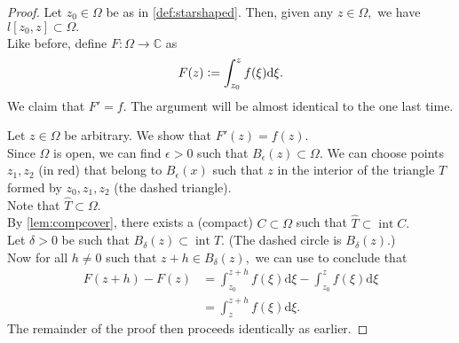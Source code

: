 \starprimitive*\label{cor:starprimitive2}
\begin{flushright}\hyperref[cor:starprimitive]{\upsym}\end{flushright}
\begin{proof}
	Let $z_0 \in \Omega$ be as in \cref{def:starshaped}. Then, given any $z \in \Omega,$ we have $l[z_0, z] \subset \Omega.$\\
	Like before, define $F:\Omega \to \mathbb{C}$ as 
	\begin{equation*} 
		F(z) \vcentcolon= \int_{z_0}^{z} f(\xi) \mathrm{d}\xi.
	\end{equation*}
	We claim that $F' = f.$ The argument will be almost identical to the one last time. \\
	\begin{center}
	\end{center}
	Let $z \in \Omega$ be arbitrary. We show that $F'(z) = f(z).$\\
	Since $\Omega$ is open, we can find $\epsilon > 0$ such that $B_\epsilon(z) \subset \Omega.$ We can choose points $z_1, z_2$ (in red) that belong to $B_\epsilon(x)$ such that $z$ in the interior of the triangle $T$ formed by $z_0, z_1, z_2$ (the dashed triangle).\\
	Note that $\widehat{T} \subset \Omega.$\\
	By \cref{lem:compcover}, there exists a (compact) $C \subset \Omega$ such that $\widehat{T} \subset \operatorname{int} C.$\\
	Let $\delta > 0$ be such that $B_\delta(z) \subset \operatorname{int} T.$ (The dashed circle is $B_\delta(z)$.)\\
	Now for all $h \neq 0$ such that $z + h \in B_\delta(z),$ we can use  to conclude that
	\begin{align*} 
		F(z + h) - F(z) &= \int_{z_0}^{z+h} f(\xi) \mathrm{d}\xi - \int_{z_0}^{z} f(\xi) \mathrm{d}\xi\\
		&= \int_{z}^{z+h} f(\xi) \mathrm{d}\xi.
	\end{align*}
	The remainder of the proof then proceeds identically as earlier.
\end{proof}


